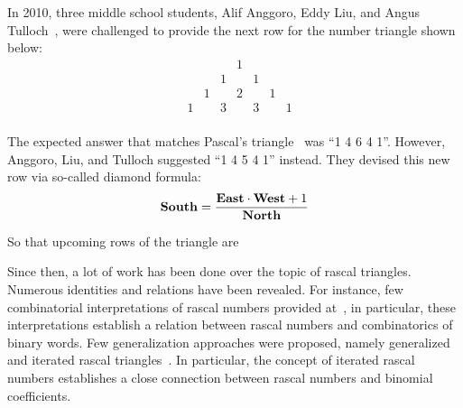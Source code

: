 In 2010, three middle school students, Alif Anggoro, Eddy Liu, and Angus Tulloch~\cite{anggoro2010rascal},
were challenged to provide the next row for the number triangle shown below:
\[
    \begin{array}{cccccccc}
        &   &   &   & 1 &   &   &   \\
        &   &   & 1 &   & 1 &   &   \\
        &   & 1 &   & 2 &   & 1 &   \\
        & 1 &   & 3 &   & 3 &   & 1 \\
    \end{array}
\]

The expected answer that matches Pascal's triangle~\cite{sloane1994pascal} was ``1 4 6 4 1''.
However, Anggoro, Liu, and Tulloch suggested ``1 4 5 4 1'' instead.
They devised this new row via so-called diamond formula:
\begin{align*}
    \mathbf{South}  = \frac{\mathbf{East} \cdot \mathbf{West} + 1}{\mathbf{North}}
\end{align*}

So that upcoming rows of the triangle are


Since then, a lot of work has been done over the topic of rascal triangles.
Numerous identities and relations have been revealed.
For instance, few combinatorial interpretations of rascal numbers provided at~\cite{gibbs2024two}, in particular,
these interpretations establish a relation between rascal numbers and combinatorics of binary words.
Few generalization approaches were proposed, namely generalized
and iterated rascal triangles~\cite{hotchkiss2019generalized,gregory2023iterated}.
In particular, the concept of iterated rascal numbers establishes a close connection between rascal numbers and binomial
coefficients.
